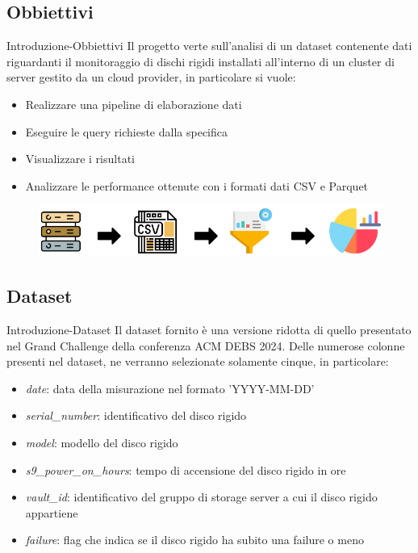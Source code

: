 \documentclass[13pt,aspectratio=169,t,xcolor=table]{beamer}
\begin{document}
\subsection{Obbiettivi}
\begin{frame}{Introduzione-Obbiettivi}
    Il progetto verte sull'analisi di un dataset contenente dati riguardanti il monitoraggio di dischi rigidi installati all'interno di un cluster di server gestito da un cloud provider, in particolare si vuole: 
    \vspace{0.3cm}
    \begin{itemize}
        \item Realizzare una pipeline di elaborazione dati
        \item Eseguire le query richieste dalla specifica
        \item Visualizzare i risultati
        \item Analizzare le performance ottenute con i formati dati CSV e Parquet
    \end{itemize}
    \vspace{0.3cm}
    \begin{figure}
        \raggedright
        \hspace{2cm}
        \includegraphics[width=.7\textwidth]{res/intro_icon.png}
    \end{figure}
\end{frame}

\subsection{Dataset}
\begin{frame}{Introduzione-Dataset}
    Il dataset fornito è una versione ridotta di quello presentato nel Grand Challenge della conferenza ACM DEBS 2024. Delle numerose colonne presenti nel dataset, ne verranno selezionate
    solamente cinque, in particolare:
    \begin{itemize}
        \item \textit{date}: data della misurazione nel formato 'YYYY-MM-DD'
        \item \textit{serial\_number}: identificativo del disco rigido
        \item \textit{model}: modello del disco rigido
        \item \textit{s9\_power\_on\_hours}: tempo di accensione del disco rigido in ore
        \item \textit{vault\_id}: identificativo del gruppo di storage server a cui il disco rigido appartiene
        \item \textit{failure}: flag che indica se il disco rigido ha subito una failure o meno
    \end{itemize}
\end{frame}
\end{document}
